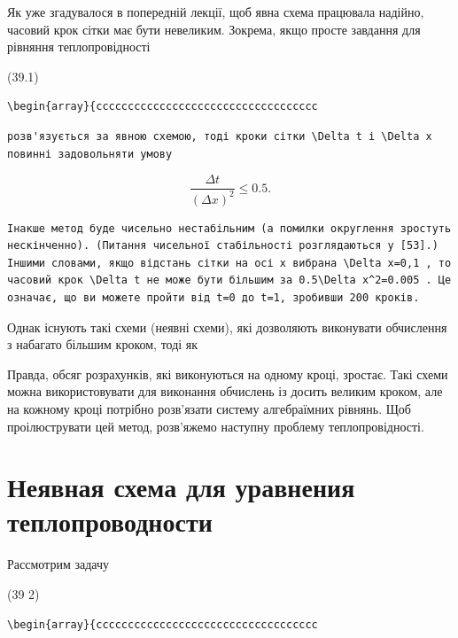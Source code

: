 \documentclass[
  ukrainian,
]{article}
\begin{document}
Як уже згадувалося в попередній лекції, щоб явна схема працювала
надійно, часовий крок сітки має бути невеликим. Зокрема, якщо просте
завдання для рівняння теплопровідності

(39.1)

\begin{verbatim}
\begin{array}{ccccccccccccccccccccccccccccccccccc
\end{verbatim}

\begin{verbatim}
розв'язується за явною схемою, тоді кроки сітки \Delta t і \Delta x повинні задовольняти умову
\end{verbatim}

\[
\frac{\Delta t}{(\Delta x)^2} \leqslant 0.5.
\]

\begin{verbatim}
Інакше метод буде чисельно нестабільним (а помилки округлення зростуть нескінченно). (Питання чисельної стабільності розглядаються у [53].) Іншими словами, якщо відстань сітки на осі x вибрана \Delta x=0,1 , то часовий крок \Delta t не може бути більшим за 0.5\Delta x^2=0.005 . Це означає, що ви можете пройти від t=0 до t=1, зробивши 200 кроків.
\end{verbatim}

Однак існують такі схеми (неявні схеми), які дозволяють виконувати
обчислення з набагато більшим кроком, тоді як

Правда, обсяг розрахунків, які виконуються на одному кроці, зростає.
Такі схеми можна використовувати для виконання обчислень із досить
великим кроком, але на кожному кроці потрібно розв'язати систему
алгебраїмних рівнянь. Щоб проілюструвати цей метод, розв'яжемо наступну
проблему теплопровідності.

\section{Неявная схема для уравнения
теплопроводности}\label{ux43dux435ux44fux432ux43dux430ux44f-ux441ux445ux435ux43cux430-ux434ux43bux44f-ux443ux440ux430ux432ux43dux435ux43dux438ux44f-ux442ux435ux43fux43bux43eux43fux440ux43eux432ux43eux434ux43dux43eux441ux442ux438}

Рассмотрим задачу

(39 2)

\begin{verbatim}
\begin{array}{ccccccccccccccccccccccccccccccccccc
\end{verbatim}
\end{document}
